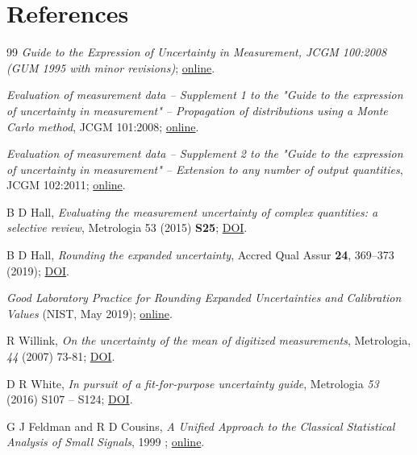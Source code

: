 \section*{References}

\begingroup
\renewcommand{\section}[2]{}%

\begin{thebibliography}{99}
 \textit{Guide to the Expression of Uncertainty in Measurement, JCGM 100:2008 (GUM 1995 with minor revisions)}; \href{http://www.bipm.org/utils/common/documents/jcgm/JCGM_100_2008_E.pdf}{online}.

 \textit{Evaluation of measurement data – Supplement 1 to the "Guide to the expression of uncertainty in measurement" – Propagation of distributions using a Monte Carlo method}, JCGM 101:2008; \href{http://www.bipm.org/utils/common/documents/jcgm/JCGM_101_2008_E.pdf}{online}.
 
 \textit{Evaluation of measurement data – Supplement 2 to the "Guide to the expression of uncertainty in measurement" – Extension to any number of output quantities}, JCGM 102:2011; \href{http://www.bipm.org/utils/common/documents/jcgm/JCGM_102_2011_E.pdf}{online}.


B D Hall, \textit{Evaluating the measurement uncertainty of complex quantities: a selective review}, Metrologia 53 (2015) \textbf{S25}; \href{http://dx.doi.org/10.1088/0026-1394/53/1/S25}{DOI}.

B D Hall, \textit{Rounding the expanded uncertainty}, Accred Qual Assur \textbf{24}, 369–373 (2019); \href{https://doi.org/10.1007/s00769-019-01400-z}{DOI}.

\textit{Good Laboratory Practice for Rounding Expanded Uncertainties and Calibration Values} (NIST, May 2019); \href{https://www.nist.gov/document/glp-9-rounding-20190506pdf}{online}. 

R Willink, \textit{On the uncertainty of the mean of digitized measurements}, Metrologia, \textit{44} (2007) 73-81; \href{http://dx.doi.org/10.1088/0026-1394/44/1/011}{DOI}.

D R White, \textit{In pursuit of a fit-for-purpose uncertainty guide}, Metrologia \textit{53} (2016) S107 – S124; \href{http://dx.doi.org/10.1088/0026-1394/53/4/S107}{DOI}.

G J Feldman and R D Cousins, \textit{A Unified Approach to the Classical Statistical Analysis of Small Signals}, 1999 ; \href{http://arxiv.org/abs/physics/9711021/}{online}.

\end{thebibliography}
\endgroup